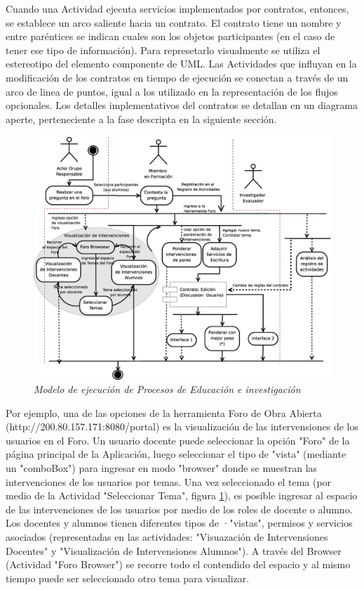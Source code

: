 \documentclass[12 pt,a4paper]{llncs}
\begin{document}
Cuando una Actividad ejecuta servicios implementados por contratos, entonces, se establece un arco saliente hacia un contrato. El contrato tiene un nombre y entre paréntices se indican cuales son los objetos participantes (en el caso de tener ese tipo de información). Para represetarlo visualmente se utiliza el estereotipo del elemento componente de UML. Las Actividades que influyan en la modificación de los contratos en tiempo de ejecución se conectan a través de un arco de linea de puntos, igual a los utilizado en la representación de los flujos opcionales. Los detalles implementativos del contratos se detallan en un diagrama aperte, perteneciente a la fase descripta en la siguiente sección.

	\begin{figure}[!h]
        \begin{center}

	\includegraphics[width=5 in,totalheight=4 in]{proceso.eps}
                                    \caption{\small \sl Modelo de ejecución de Procesos de Educación e investigación} \label{modelodeejecucion}
         \end{center}
         \end{figure}


Por ejemplo, una de las opciones de la herramienta Foro de Obra Abierta (http://200.80.157.171:8080/portal) es la visualización de las intervensiones de los usuarios en el Foro. Un usuario docente puede seleccionar la opción "Foro" de la página principal de la Aplicación, luego seleccionar el tipo de "vista" (mediante un "comboBox") para ingresar en modo "browser" donde se muestran las intervenciones de los usuarios por temas. Una vez seleccionado el tema (por medio de la Actividad "Seleccionar Tema", figura \ref{modelodeejecucion}), es posible ingresar al espacio de las intervenciones de los usuarios por medio de los roles de docente o alumno. Los docentes y alumnos tienen diferentes tipos de ·"vistas", permisos y servicios asociados (representadas en las actividades: "Visuazación de Intervensiones Docentes" y "Visualización de Intervensiones Alumnos"). A  través del Browser (Actividad "Foro Browser") se recorre todo el contendido del espacio y al mismo tiempo puede ser seleccionado otro tema para visualizar.
\end{document}

